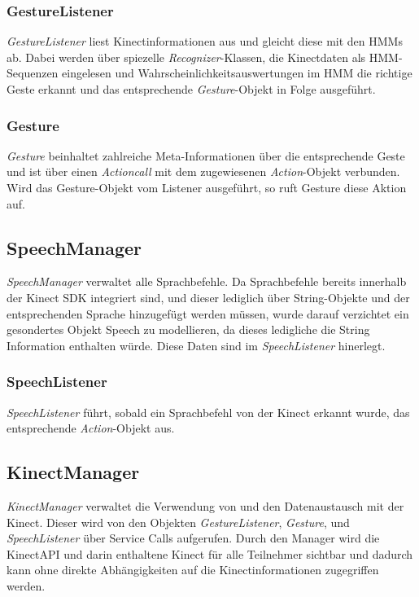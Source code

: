 \subsubsection{GestureListener}
\textit{GestureListener} liest Kinectinformationen aus und gleicht diese mit den \glspl{HMM} ab. Dabei werden \"uber spiezelle \textit{Recognizer}-Klassen, die Kinectdaten als HMM-Sequenzen eingelesen und Wahrscheinlichkeitsauswertungen im \gls{HMM} die richtige Geste erkannt und das entsprechende \textit{Gesture}-Objekt in Folge ausgef\"uhrt.

\subsubsection{Gesture}
\textit{Gesture} beinhaltet zahlreiche Meta-Informationen \"uber die entsprechende Geste und ist \"uber einen \textit{Actioncall} mit dem zugewiesenen \textit{Action}-Objekt verbunden. Wird das Gesture-Objekt vom Listener ausgef\"uhrt, so ruft Gesture diese Aktion auf.

\subsection{SpeechManager}
\textit{SpeechManager} verwaltet alle Sprachbefehle. Da Sprachbefehle bereits innerhalb der Kinect SDK integriert sind, und dieser lediglich \"uber String-Objekte und der entsprechenden Sprache hinzugef\"ugt werden m\"ussen, wurde darauf verzichtet ein gesondertes Objekt {Speech} zu modellieren, da dieses ledigliche die String Information enthalten w\"urde. Diese Daten sind im \textit{SpeechListener} hinerlegt.

\subsubsection{SpeechListener}
\textit{SpeechListener} f\"uhrt, sobald ein Sprachbefehl von der Kinect erkannt wurde, das entsprechende \textit{Action}-Objekt aus.

\subsection{KinectManager}
\textit{KinectManager} verwaltet die Verwendung von und den Datenaustausch mit der Kinect. Dieser wird von den Objekten \textit{GestureListener}, \textit{Gesture}, und \textit{SpeechListener} \"uber Service Calls aufgerufen.
\newline
Durch den Manager wird die KinectAPI und darin enthaltene Kinect f\"ur alle Teilnehmer sichtbar und dadurch kann ohne direkte Abh\"angigkeiten auf die Kinectinformationen zugegriffen werden.

